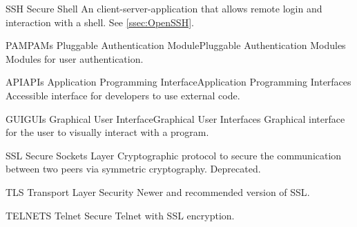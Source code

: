 %
{SSH}{}%
{Secure Shell}{}%
{An client-server-application that allows remote login and interaction with a \gls{shell}. See \ref{ssec:OpenSSH}.}

%
{PAM}{PAMs}%
{Pluggable Authentication Module}{Pluggable Authentication Modules}%
{Modules for user authentication.}

%
{API}{APIs}%
{Application Programming Interface}{Application Programming Interfaces}%
{Accessible interface for developers to use external code.}

%
{GUI}{GUIs}%
{Graphical User Interface}{Graphical User Interfaces}%
{Graphical interface for the user to visually interact with a program.}

%
{SSL}{}%
{Secure Sockets Layer}{}%
{Cryptographic protocol to secure the communication between two peers via symmetric cryptography. Deprecated.}

%
{TLS}{}%
{Transport Layer Security}{}%
{Newer and recommended version of \gls{SSL}.}

%
{TELNETS}{}%
{Telnet Secure}{}%
{Telnet with \gls{SSL} encryption.}


